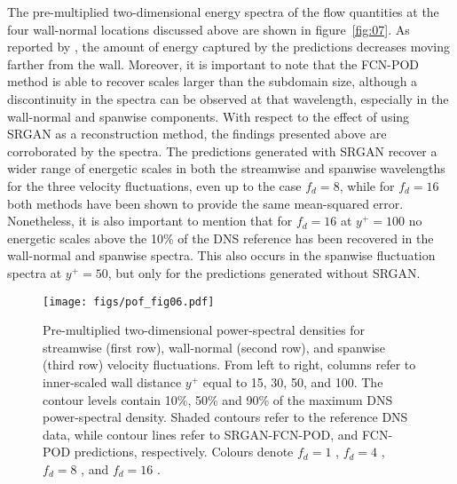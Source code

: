 The pre-multiplied two-dimensional energy spectra of the flow quantities at the four wall-normal locations discussed above are shown in figure~\ref{fig:07}.
As reported by \citet{guastoni2020convolutional}, the amount of energy captured by the predictions decreases moving farther from the wall.
Moreover, it is important to note that the FCN-POD method is able to recover scales larger than the subdomain size, although a discontinuity in the spectra can be observed at that wavelength, especially in the wall-normal and spanwise components.
With respect to the effect of using SRGAN as a reconstruction method, the findings presented above are corroborated by the spectra.
The predictions generated with SRGAN recover a wider range of energetic scales in both the streamwise and spanwise wavelengths for the three velocity fluctuations, even up to the case $f_d=8$, while for $f_d=16$ both methods have been shown to provide the same mean-squared error.
Nonetheless, it is also important to mention that for $f_d=16$ at $y^+=100$ no energetic scales above the 10\% of the DNS reference has been recovered in the wall-normal and spanwise  spectra.
This also occurs in the spanwise fluctuation spectra at $y^+=50$, but only for the predictions generated without SRGAN.
\begin{figure}
  \centerline{\texttt{[image: figs/pof\_fig06.pdf]}}
  \caption{Pre-multiplied two-dimensional power-spectral densities for streamwise (first row), wall-normal (second row), and spanwise (third row) velocity fluctuations. From left to right, columns refer to inner-scaled wall distance $y^+$ equal to 15, 30, 50, and 100. The contour levels contain 10\%, 50\% and 90\% of the maximum DNS power-spectral density. Shaded contours refer to the reference DNS data, while contour lines refer to  SRGAN-FCN-POD, and  FCN-POD predictions, respectively. Colours denote $f_d=1$ , $f_d=4$ , $f_d=8$ , and $f_d=16$ .}
\label{fig:06}
\end{figure}

